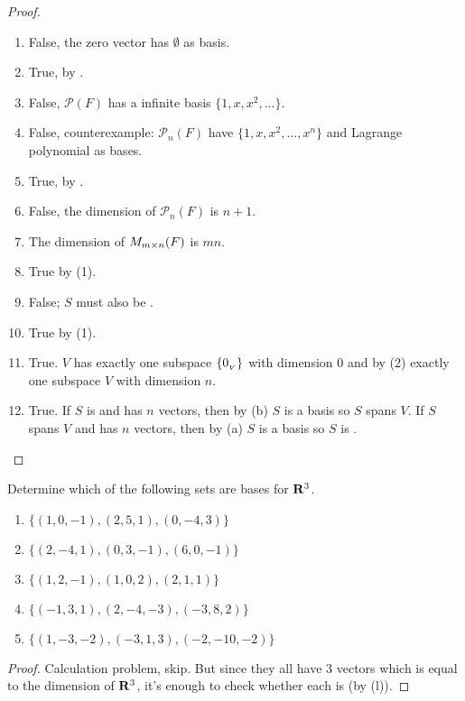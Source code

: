 \begin{proof}\ 
\begin{enumerate}
\item False, the zero vector has \(\emptyset\) as basis.
\item True, by .
\item False, \(\mathcal{P}(F)\) has a infinite basis \(\{ 1, x, x^2, ... \}\).
\item False, counterexample: \(\mathcal{P}_n(F)\) have \(\{ 1, x, x^2, ..., x^n \}\) and Lagrange polynomial as bases.
\item True, by \CORO{1.10.1}.
\item False, the dimension of \(\mathcal{P}_n(F)\) is \(n + 1\).
\item The dimension of \(M_{m \times n}(F)\) is \(mn\).
\item True by (1).
\item False; \(S\) must also be \LID{}.
\item True by (1).
\item True. \(V\) has exactly one subspace \(\{ 0_{_V} \}\) with dimension \(0\) and by (2) exactly one subspace \(V\) with dimension \(n\).
\item True.
    If \(S\) is \LID{} and has \(n\) vectors, then by (b) \(S\) is a basis so \(S\) spans \(V\).
    If \(S\) spans \(V\) and has \(n\) vectors, then by \CORO{1.10.3}(a) \(S\) is a basis so \(S\) is \LID{}. 
\end{enumerate}
\end{proof}

\begin{exercise} \label{exercise 1.6.2}
Determine which of the following sets are bases for \(\mathbf{R}^3\).
\begin{enumerate}
\item \(\{ (1 , 0, -1), (2, 5, 1), (0, -4, 3) \}\)
\item \(\{ (2, -4, 1), (0, 3, -1), (6, 0, -1) \}\)
\item \(\{ (1, 2, -1), (1, 0, 2), (2, 1, 1) \}\)
\item \(\{ (-1, 3, 1),(2, -4, -3),(-3, 8 ,2) \}\)
\item \(\{ (1, -3, -2), (-3, 1, 3), (-2, -10, -2) \}\)
\end{enumerate}
\end{exercise}

\begin{proof}
Calculation problem, skip.
But since they all have \(3\) vectors which is equal to the dimension of \(\mathbf{R}^3\), it's enough to check whether each is \LID{} (by (l)).
\end{proof}

